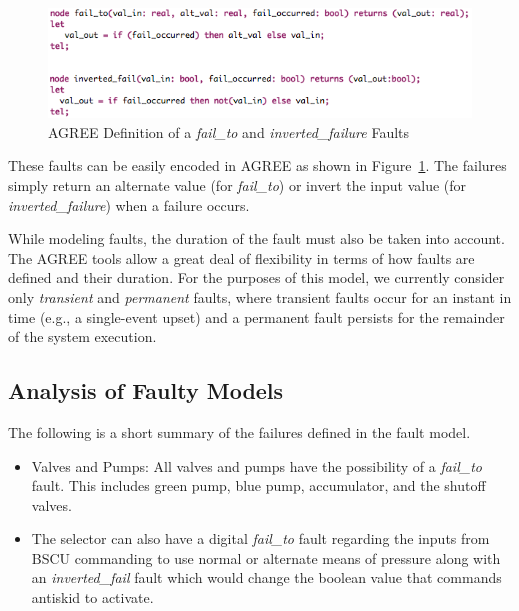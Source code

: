 \begin{figure}[h!]
  \centering
 \includegraphics[width=1\textwidth]{images/failureNodes.png}
  \vspace{-0.1in}
  \caption{AGREE Definition of a \textit{fail\_to} and \textit{inverted\_failure} Faults}
  \label{fig:failureNodes}
\end{figure}

These faults can be easily encoded in AGREE as shown in Figure~\ref{fig:failureNodes}.  The failures simply return an alternate value (for {\em fail\_to}) or invert the input value (for {\em inverted\_failure}) when a failure occurs.
 

While modeling faults, the duration of the fault must also be taken into account.  The AGREE tools allow a great deal of flexibility in terms of how faults are defined and their duration.  For the purposes of this model, we currently consider only {\em transient} and {\em permanent} faults, where transient faults occur for an instant in time (e.g., a single-event upset) and a permanent fault persists for the remainder of the system execution.


\subsection{Analysis of Faulty Models}
The following is a short summary of the failures defined in the fault model.

\begin{itemize}

\item Valves and Pumps: All valves and pumps have the possibility of a \textit{fail\_to} fault. This includes green pump, blue pump, accumulator, and the shutoff valves.

\item  The selector can also have a digital \textit{fail\_to} fault regarding the inputs from BSCU commanding to use normal or alternate means of pressure along with an \textit{inverted\_fail} fault which would change the boolean value that commands antiskid to activate.

\end{itemize}

